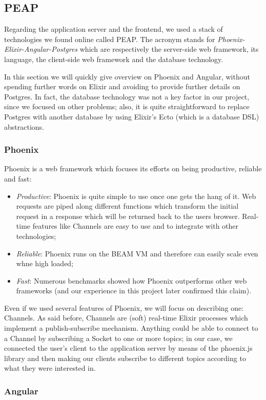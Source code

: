 \subsection{PEAP}
Regarding the application server and the frontend, we used a stack of
technologies we found online called PEAP. The acronym stands for
\textit{Phoenix-Elixir-Angular-Postgres} which are respectively the
server-side web framework, its language, the client-side web framework and the
database technology.

In this section we will quickly give overview on Phoenix and Angular, without
spending further words on Elixir and avoiding to provide further details on
Postgres. In fact, the database technology was not a key factor in our project,
since we focused on other problems; also, it is quite straightforward to
replace Postgres with another database by using Elixir's Ecto (which is a
database DSL) abstractions.

\subsubsection{Phoenix}

Phoenix is a web framework which focuses its efforts on being productive,
reliable and fast:

\begin{itemize}
  \item \textit{Productive}: Phoenix is quite simple to use once one gets the
    hang of it. Web requests are piped along different functions which
    transform the initial request in a response which will be returned back to
    the users browser. Real-time features like Channels are easy to use and to
    integrate with other technologies;
  \item \textit{Reliable}: Phoenix runs on the BEAM VM and therefore can easily
    scale even whne high loaded;
  \item \textit{Fast}: Numerous benchmarks showed how Phoenix outperforms other
    web frameworks (and our experience in this project later confirmed this
    claim).
\end{itemize}

Even if we used several features of Phoenix, we will focus on describing one:
Channels. As said before, Channels are (soft) real-time Elixir processes which
implement a publish-subscribe mechanism.
Anything could be able to connect to a Channel by subscribing a Socket to one
or more topics; in our case, we connected the user's client to the application
server by means of the phoenix.js library and then making our clients subscribe
to different topics according to what they were interested in.

\subsubsection{Angular}

